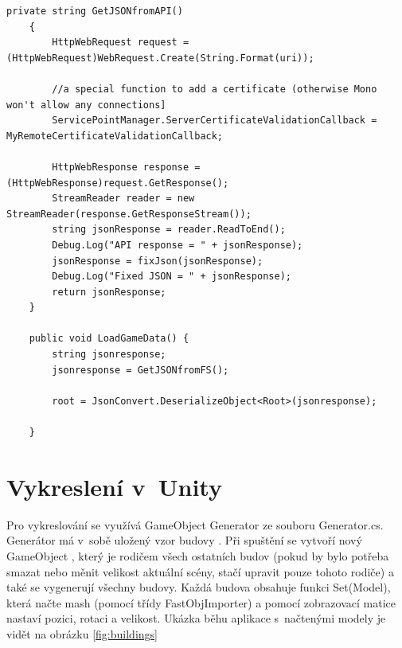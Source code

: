 \documentclass[thesis=B,czech]{FITthesis}[2012/06/26]
\begin{document}
	\begin{lstlisting}[frame=single]
	 private string GetJSONfromAPI()
    {
        HttpWebRequest request = (HttpWebRequest)WebRequest.Create(String.Format(uri));

        //a special function to add a certificate (otherwise Mono won't allow any connections]
        ServicePointManager.ServerCertificateValidationCallback = MyRemoteCertificateValidationCallback;

        HttpWebResponse response = (HttpWebResponse)request.GetResponse();
        StreamReader reader = new StreamReader(response.GetResponseStream());
        string jsonResponse = reader.ReadToEnd();
        Debug.Log("API response = " + jsonResponse);
        jsonResponse = fixJson(jsonResponse);
        Debug.Log("Fixed JSON = " + jsonResponse);
        return jsonResponse;
    }

    public void LoadGameData() {
        string jsonresponse;
        jsonresponse = GetJSONfromFS();

        root = JsonConvert.DeserializeObject<Root>(jsonresponse);       

    }
	\end{lstlisting}
	
	
	\section{Vykreslení v~Unity}
    Pro vykreslování se využívá GameObject Generator ze souboru Generator.cs. Generátor má v~sobě uložený vzor budovy . Při spuštění se vytvoří nový GameObject , který je rodičem všech ostatních budov (pokud by bylo potřeba smazat nebo měnit velikost aktuální scény, stačí upravit pouze tohoto rodiče) a také se vygenerují všechny budovy. Každá budova obsahuje funkci Set(Model), která načte mash (pomocí třídy FastObjImporter) a pomocí zobrazovací matice nastaví pozici, rotaci a velikost. Ukázka běhu aplikace s~načtenými modely je vidět na obrázku \ref{fig:buildings}
    
    
\end{document}
